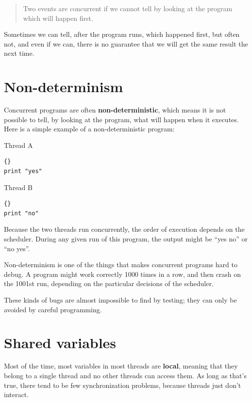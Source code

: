 \documentclass{book}
\begin{document}
\begin{quote}
Two events are concurrent if we cannot tell by looking at
the program which will happen first.
\end{quote}

Sometimes we can tell, after the program runs, which happened first,
but often not, and even if we can, there is no guarantee that we will
get the same result the next time.


\newpage
\section {Non-determinism}

Concurrent programs are often {\bf non-deterministic}, which means it
is not possible to tell, by looking at the program, what will happen
when it executes.  Here is a simple example of a
non-deterministic program:

\begin{minipage}[t]{2in}
Thread A                
\begin{lstlisting}[labelstyle=a, indent=25pt]{}
print "yes"
\end{lstlisting}
\end{minipage}
\hfill
\begin{minipage}[t]{2in}
Thread B
\begin{lstlisting}[labelstyle=b, indent=25pt]{}
print "no"
\end{lstlisting}
\end{minipage}

Because the two threads run concurrently, the order of
execution depends on the scheduler.  During any given run
of this program, the output might be ``yes no'' or ``no yes''.

Non-determinism is one of the things that makes concurrent
programs hard to debug.  A program might work correctly
1000 times in a row, and then crash on the 1001st run, depending
on the particular decisions of the scheduler.

These kinds of bugs are almost impossible to find by testing;
they can only be avoided by careful programming.


\section {Shared variables}
\label{shared}

Most of the time, most variables in most threads are {\bf local},
meaning that they belong to a single thread and no other threads
can access them.  As long as that's true, there tend to be few
synchronization problems, because threads just don't interact.
\end{document}
